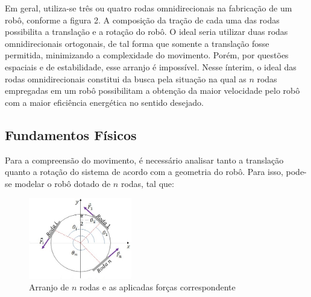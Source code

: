 \documentclass{article}
\begin{document}
Em geral, utiliza-se três ou quatro rodas omnidirecionais na fabricação de um robô, conforme a figura 2. A composição da tração de cada uma das rodas possibilita a translação e a rotação do robô. O ideal seria utilizar duas rodas omnidirecionais ortogonais, de tal forma que somente a translação fosse permitida, minimizando a complexidade do movimento. Porém, por questões espaciais e de estabilidade, esse arranjo é impossível. 
Nesse ínterim, o ideal das rodas omnidirecionais constitui da busca pela situação na qual as $n$ rodas empregadas em um robô possibilitam a obtenção da maior velocidade pelo robô com a maior eficiência energética no sentido desejado.


\subsection{Fundamentos Físicos}

\hspace{1cm}Para a compreensão do movimento, é necessário analisar tanto a translação quanto a rotação do sistema de acordo com a geometria do robô. Para isso, pode-se modelar o robô dotado de $n$ rodas, tal que:

\begin{figure}[H]
\centering
\includegraphics[width=0.4\textwidth]{roda.jpeg}
\caption{Arranjo de $n$ rodas e as aplicadas forças correspondente}
\label{Rotulo}
\end{figure}
\end{document}

